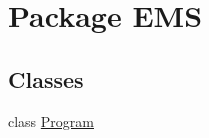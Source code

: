 \hypertarget{namespace_e_m_s}{\section{Package E\-M\-S}
\label{namespace_e_m_s}
}
\subsection*{Classes}
\begin{DoxyCompactItemize}
\item 
class \hyperlink{class_e_m_s_1_1_program}{Program}
\end{DoxyCompactItemize}
